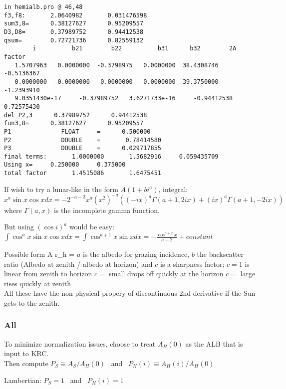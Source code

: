 \vspace{-3.mm} 
\begin{verbatim}
in hemialb.pro @ 46,48
f3,f8:       2.0640982       0.031476598
sum3,8=      0.38127627      0.95209557
D3,D8=       0.37989752      0.94412538
qsum=        0.72721736      0.82559132
        i          b21        b22          b31      b32        2A factor
   1.5707963   0.0000000  -0.3798975   0.0000000  38.4308746  -0.5136367
   0.0000000  -0.0000000  -0.0000000  -0.0000000  39.3750000  -1.2393910
   9.0351430e-17     -0.37989752   3.6271733e-16     -0.94412538      0.72575430
del P2,3      0.37989752      0.94412538
fun3,8=      0.38127627      0.95209557
P1              FLOAT     =      0.500000
P2              DOUBLE    =       0.78414580
P3              DOUBLE    =      0.029717855
final terms:       1.0000000       1.5682916     0.059435709
Using x=     0.250000     0.375000
total factor       1.4515086       1.6475451
\end{verbatim} 

If wish to try a lunar-like in the form $A ( 1+ b i^a)$,   
integral:  $x^a \sin x \cos x dx = -2^{-a-3} x^a (x^2)^{-a} ((-i x)^a \Gamma(a+1, 2 i x)+(i x)^a \Gamma(a+1, -2 i x))$
where $\Gamma(a,x)$ is the incomplete gamma function.

But using $(\cos i)^a$ would be easy:  $\int  \cos^a x \sin x \cos x dx = \int \cos^{a+1} x \sin x dx =  -\frac{\cos^{a+2} x}{a+2} +constant $

Possible form \qbn A \equiv r_h =  
$a$ is the albedo for grazing incidence, $b$ the backscatter ratio (Albedo at zenith / albedo at horizon) and $c$ is a sharpness factor;
\qi $c=1$ is linear from zenith to horizon 
\qi $c=$ small drops off quickly at the horizon
\qi $c=$ large rises quickly at zenith
\\ All these have the non-physical propery of discontinuous 2nd derivative if the Sun gets to the zenith.

\normalsize

\subsubsection{All \label{all}} 

To minimize normalization issues, choose to treat $A_H(0)$ as the ALB that is input to KRC. \\
\large Then compute $P_S \equiv A_S/A_H(0)  $ \ and \ $ P_H(i)  \equiv A_H(i)/A_H(0)$

Lambertian: $P_S =1 $ \ and \ $ P_H(i)=1$

